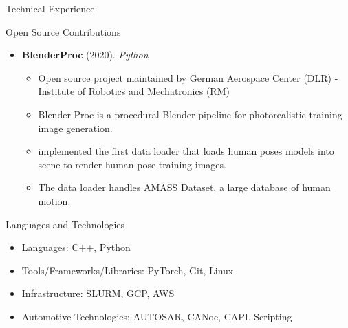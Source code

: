 \documentclass[]{mcdowellcv}
\begin{document}
\begin{cvsection}{Technical Experience}
\begin{cvsubsection}{Open Source Contributions}{}{}
\begin{itemize}
						\item \textbf{BlenderProc} (2020). \textit{Python}
				\begin{itemize}
					\item Open source project maintained by German Aerospace Center (DLR) - Institute of Robotics and Mechatronics (RM)
					\item Blender Proc is a procedural Blender pipeline for photorealistic training image generation.
					\item implemented the first data loader that loads human poses models into scene to render human pose training images.
					\item The data loader handles AMASS Dataset, a large database of human motion.
				\end{itemize}
\end{itemize}
		\end{cvsubsection}
	\end{cvsection}
	
	
	\begin{cvsection}{Languages and Technologies}
		\begin{cvsubsection}{}{}{}	
			\begin{itemize}
				\item Languages: C++, Python
				\item Tools/Frameworks/Libraries: PyTorch, Git, Linux
				\item Infrastructure: SLURM, GCP, AWS
				\item Automotive Technologies: AUTOSAR, CANoe, CAPL Scripting
			\end{itemize}
		\end{cvsubsection}
	\end{cvsection}
\end{document}
